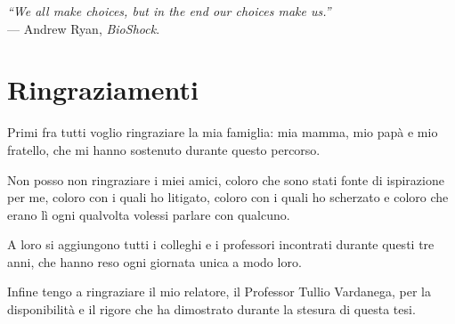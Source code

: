 \cleardoublepage
{}
{}

\begin{flushright}{
    \slshape
    ``We all make choices, but in the end our choices make us.''} \\
    \medskip
    --- Andrew Ryan, \textit{BioShock}.
\end{flushright}

\begingroup
\let\clearpage\relax
\let\cleardoublepage\relax
\let\cleardoublepage\relax

\chapter*{Ringraziamenti}

\vspace{0.35cm}

\noindent Primi fra tutti voglio ringraziare la mia famiglia: mia mamma, mio papà e mio fratello, che mi hanno sostenuto durante questo percorso.

\vspace{0.35cm}

\noindent Non posso non ringraziare i miei amici, coloro che sono stati fonte di ispirazione per me, coloro con i quali ho litigato, coloro con i quali ho scherzato e coloro che erano lì ogni qualvolta volessi parlare con qualcuno.

\vspace{0.35cm}

\noindent A loro si aggiungono tutti i colleghi e i professori incontrati durante questi tre anni, che hanno reso ogni giornata unica a modo loro.

\vspace{0.35cm}

\noindent Infine tengo a ringraziare il mio relatore, il Professor Tullio Vardanega, per la disponibilità e il rigore che ha dimostrato durante la stesura di questa tesi.

\vspace{0.75cm}

\noindent{\myLocation, \myTime}
\hfill \textit{\myName}

\endgroup